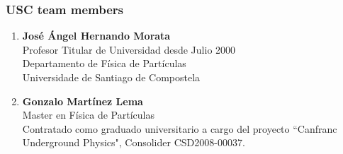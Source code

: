 %
%

\subsubsection*{USC team members}

\begin{enumerate}

\item {\bf Jos\'e \'Angel Hernando Morata} \\ Profesor Titular de Universidad desde Julio 2000 \\
 Departamento de F\'isica de Part\'iculas \\
 Universidade de Santiago de Compostela

\item {\bf Gonzalo Mart\'inez Lema} \\ 
Master en F\'isica de Part\'iculas  \\
Contratado como graduado universitario a cargo del  proyecto ``Canfranc Underground Physics", Consolider CSD2008-00037. 

\end{enumerate}
